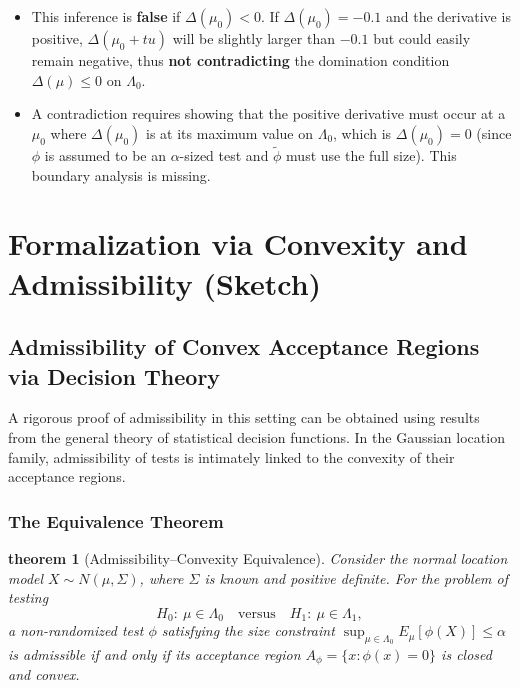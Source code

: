 \documentclass[12pt]{article}
\newtheorem{theorem}{theorem}
\begin{document}
\begin{enumerate}
    \begin{itemize}
        \item This inference is \textbf{false} if $\Delta(\mu_0) < 0$. If $\Delta(\mu_0) = -0.1$ and the derivative is positive, $\Delta(\mu_0 + t u)$ will be slightly larger than $-0.1$ but could easily remain negative, thus \textbf{not contradicting} the domination condition $\Delta(\mu) \le 0$ on $\Lambda_0$.
        \item A contradiction requires showing that the positive derivative must occur at a $\mu_0$ where $\Delta(\mu_0)$ is at its maximum value on $\Lambda_0$, which is $\Delta(\mu_0)=0$ (since $\phi$ is assumed to be an $\alpha$-sized test and $\tilde{\phi}$ must use the full size). This boundary analysis is missing.
    \end{itemize}
\end{enumerate}

\section*{Formalization via Convexity and Admissibility (Sketch)}

\subsection{Admissibility of Convex Acceptance Regions via Decision Theory}

A rigorous proof of admissibility in this setting can be obtained using results from the general theory of statistical decision functions.  In the Gaussian location family, admissibility of tests is intimately linked to the convexity of their acceptance regions.

\subsubsection*{The Equivalence Theorem}

\begin{theorem}[Admissibility–Convexity Equivalence]
Consider the normal location model $X \sim N(\mu, \Sigma)$, where $\Sigma$ is known and positive definite.
For the problem of testing
\[
H_0:\ \mu \in \Lambda_0 \quad \text{versus} \quad H_1:\ \mu \in \Lambda_1,
\]
a non-randomized test $\phi$ satisfying the size constraint
$\sup_{\mu\in\Lambda_0}E_\mu[\phi(X)] \le \alpha$
is admissible if and only if its acceptance region
$A_\phi = \{x : \phi(x)=0\}$
is closed and convex.
\end{theorem}
\end{document}

